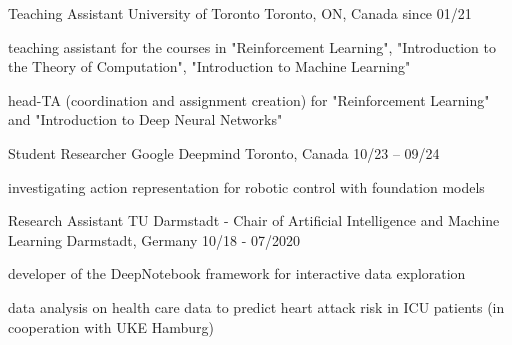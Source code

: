 

\begin{cventries}

  \cventry
    {Teaching Assistant}
    {University of Toronto}
    {Toronto, ON, Canada}
    {since 01/21}
    {
        \begin{cvitems}
        \item teaching assistant for the courses in "Reinforcement Learning", "Introduction to the Theory of Computation", "Introduction to Machine Learning"
        \item head-TA (coordination and assignment creation) for "Reinforcement Learning" and "Introduction to Deep Neural Networks"
        \end{cvitems}
    }

  \cventry
    {Student Researcher}
    {Google Deepmind}
    {Toronto, Canada}
    {10/23 -- 09/24}
    {
        \begin{cvitems}
        \item {investigating action representation for robotic control with foundation models}
        \end{cvitems}
    }



  \cventry
    {Research Assistant}
    {TU Darmstadt - Chair of Artificial Intelligence and Machine Learning}
    {Darmstadt, Germany}
    {10/18 - 07/2020}
    {
        \begin{cvitems}
        \item {developer of the DeepNotebook framework for interactive data exploration}
        \item {data analysis on health care data to predict heart attack risk in ICU patients (in cooperation with UKE Hamburg)}
        \end{cvitems}
    }


\end{cventries}
